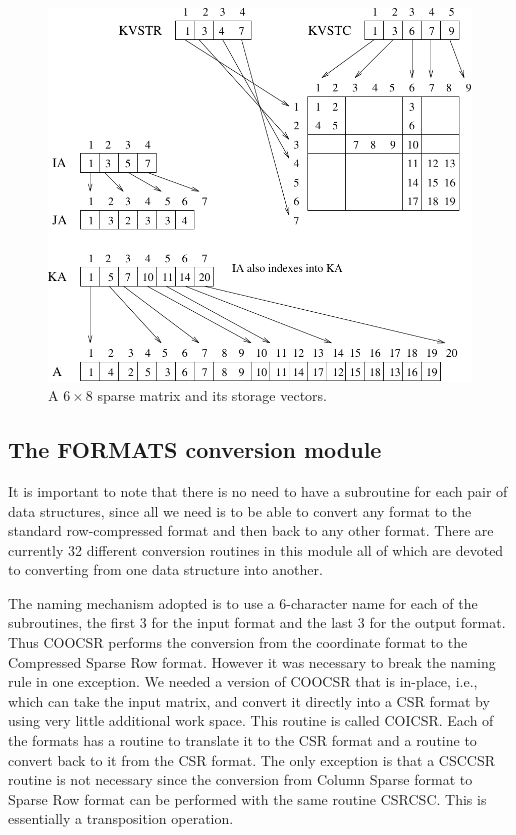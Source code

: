\documentclass[12pt]{article}
\begin{document}
\begin{figure}[htb]
\includegraphics[width=6.2in]{vbrpic}
\caption {A $6 \times 8$ sparse matrix and its storage vectors.}
\end{figure}

\subsection{The FORMATS conversion module}
It is important to note that there is no need to have a subroutine for
each pair of data structures, since all we need is to be able to
convert any format to the standard row-compressed format and then back
to any other format.  There are currently 32 different conversion
routines in this module all of which are devoted to converting from
one data structure into another.

The naming mechanism adopted is to use a 6-character name for each of
the subroutines, the first 3 for the input format and the last 3 for
the output format.  Thus COOCSR performs the conversion from the
coordinate format to the Compressed Sparse Row format.  However it was
necessary to break the naming rule in one exception.  We needed a
version of COOCSR that is in-place, i.e., which can take the input
matrix, and convert it directly into a CSR format by using very little
additional work space.  This routine is called COICSR.  Each of
the formats has a routine to translate it to the CSR format and a routine
to convert back to it from the CSR format.  The only exception is that
a CSCCSR routine is not necessary since
the conversion from Column Sparse format to Sparse Row format  can be
performed with the same routine CSRCSC.  This is essentially a transposition
operation.
\end{document}
